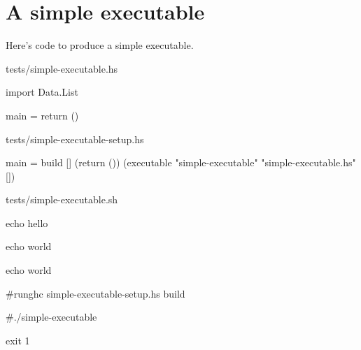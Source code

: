 \section{A simple executable}

Here's code to produce a simple executable.

\begin{file}{tests/simple-executable.hs}

import Data.List

main = return ()

\end{file}

\begin{file}{tests/simple-executable-setup.hs}

main = build [] (return ())
       (executable "simple-executable" "simple-executable.hs" [])

\end{file}



\begin{file}{tests/simple-executable.sh}

echo hello

echo world

echo world

#runghc simple-executable-setup.hs build

#./simple-executable

exit 1

\end{file}

